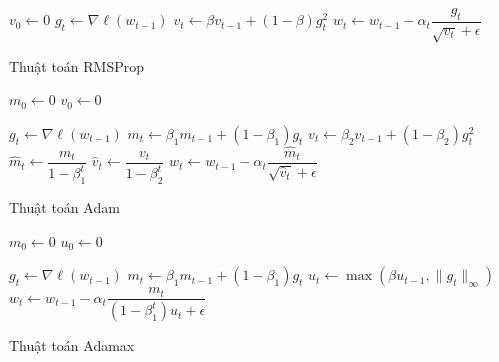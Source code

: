 \documentclass[14pt, a4paper]{article}
\theoremstyle{sltheorem}
\theoremstyle{soltheorem}
\begin{document}
\begin{algorithm}[h!]
    \DontPrintSemicolon

    $v_0 \gets 0$\;
     {
        $g_t \gets \nabla \ell (w_{t-1})$\;
        $v_t \gets \beta v_{t-1} + (1-\beta) g_t^2$\;
        $w_t \gets w_{t-1} - \alpha_t \dfrac{g_t}{\sqrt{v_t} + \epsilon}$\;
    }

    \;
    \caption{Thuật toán RMSProp}
\end{algorithm}


\begin{algorithm}[h!]
    \DontPrintSemicolon

    $m_0 \gets 0$\;
    $v_0 \gets 0$\;

     {
        $g_t \gets \nabla \ell(w_{t-1})$\;
        $m_t \gets \beta_1 m_{t-1} + (1 - \beta_1)g_t$\;
        $v_t \gets \beta_2 v_{t-1} + (1 - \beta_2)g_t^2$\;
        $\hat{m}_t \gets \dfrac{m_t}{1 - \beta_1^t}$\;
        $\hat{v}_t \gets \dfrac{v_t}{1 - \beta_2^t}$\;
        $w_t \gets w_{t-1} - \alpha_t \dfrac{\hat{m}_t}{\sqrt{\hat{v}_t} + \epsilon}$\;
    }

    \;
    \caption{Thuật toán Adam}
\end{algorithm}


\begin{algorithm}[h!]
    \DontPrintSemicolon

    $m_0 \gets 0$\;
    $u_0 \gets 0$\;

     {
        $g_t \gets \nabla \ell(w_{t-1})$\;
        $m_t \gets \beta_1 m_{t-1} + (1 - \beta_1)g_t$\;
        $u_t \gets \max (\beta u_{t-1}, \lVert g_t \rVert_{\infty})$\;
        $w_t \gets w_{t-1} - \alpha_t \dfrac{m_t}{(1-\beta_1^t)u_t + \epsilon}$\;
    }

    \;
    \caption{Thuật toán Adamax}
\end{algorithm}
\end{document}
